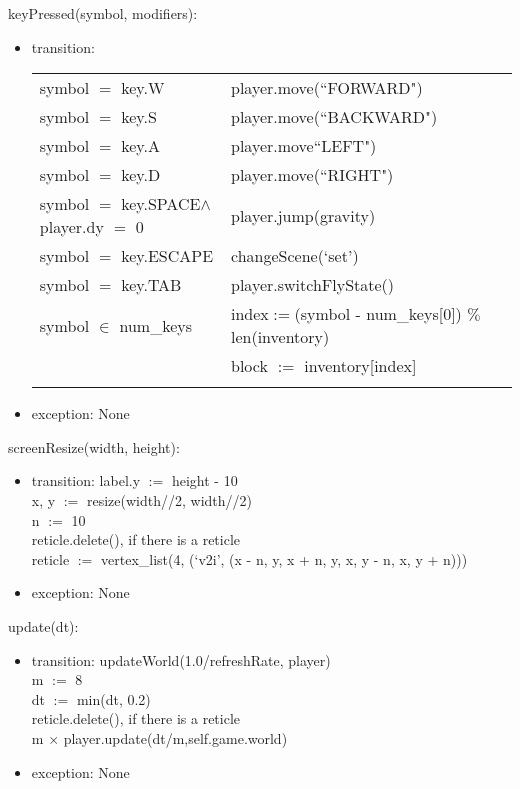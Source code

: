 \documentclass{article}
\begin{document}
\noindent keyPressed(symbol, modifiers):
\begin{itemize}
\item transition: 

\begin{tabular}{|l|l|}
\hhline{|-|-|}
symbol $=$ key.W & player.move(``FORWARD") \\
\hhline{|-|-|}
symbol $=$ key.S & player.move(``BACKWARD") \\
\hhline{|-|-|}
symbol $=$ key.A & player.move``LEFT") \\
\hhline{|-|-|}
symbol $=$ key.D & player.move(``RIGHT") \\
\hhline{|-|-|}
symbol $=$ key.SPACE$\land$player.dy $=$ 0 & player.jump(gravity) \\
\hhline{|-|-|}
symbol $=$ key.ESCAPE & changeScene(`set') \\
\hhline{|-|-|}
symbol $=$ key.TAB & player.switchFlyState() \\
\hhline{|-|-|}
symbol $\in$ num\_keys & index$:=$(symbol - num\_keys[0]) $\%$ len(inventory)\\
 &block $:=$ inventory[index] \\
\hhline{|-|-|}
\end{tabular}
\item exception: None
\end{itemize}\vspace{6mm}

\noindent screenResize(width, height):
\begin{itemize}
\item transition: label.y $:=$ height - 10\\
    x, y $:=$ resize(width//2, width//2)\\
    n $:=$ 10\\
    reticle.delete(), if there is a reticle\\
    reticle $:=$ vertex\_list(4, (`v2i', (x - n, y, x + n, y, x, y - n, x, y + n)))
\item exception: None
\end{itemize}\vspace{6mm}

\noindent update(dt):
\begin{itemize}
\item transition: updateWorld(1.0/refreshRate, player)\\
    m $:=$ 8\\
    dt $:=$ min(dt, 0.2)\\
    reticle.delete(), if there is a reticle\\
    m $\times$ player.update(dt/m,self.game.world)
\item exception: None
\end{itemize}\vspace{6mm}
\end{document}
